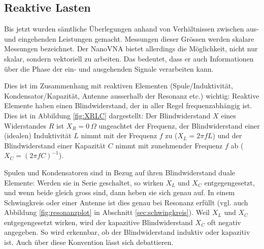 \documentclass[twoside,a4paper,11pt,halfparskip,DIV=11,notitlepage]{scrartcl}
\begin{document}
\subsection{Reaktive Lasten}\label{sec:vectors}
Bis jetzt wurden sämtliche Überlegungen anhand von Verhältnissen zwischen
aus- und eingehenden Leistungen gemacht. Messungen dieser Grössen werden
skalare Messungen bezeichnet. Der NanoVNA bietet allerdings die Möglichkeit,
nicht nur skalar, sondern vektoriell zu arbeiten. Das bedeutet, dass er auch
Informationen über die Phase der ein- und ausgehenden Signale verarbeiten kann.

Dies ist im Zusammenhang mit reaktiven Elementen (Spule/Induktivität,
Kondensator/Kapazität, Antenne ausserhalb der Resonanz etc.) wichtig: Reaktive
Elemente haben einen Blindwiderstand, der in aller Regel frequenzabhängig ist.
Dies ist in Abbildung \ref{fig:XRLC} dargestellt: Der Blindwiderstand $X$ eines
Widerstandes $R$ ist $X_R=0~\Omega$ ungeachtet der Frequenz, der Blindwiderstand
einer (idealen) Induktivität $L$ nimmt mit der Frequenz $f$ zu ($X_L=2\pi f L$)
und der Blindwiderstand einer Kapazität $C$ nimmt mit zunehmender Frequenz $f$
ab ($X_C=(2\pi f C)^{-1}$).

Spulen und Kondensatoren sind in Bezug auf ihren Blindwiderstand duale Elemente:
Werden sie in Serie geschaltet, so wirken $X_L$ und $X_C$ entgegengesetzt, und
wenn beide gleich gross sind, dann heben sie sich genau auf. In einem
Schwingkreis oder einer Antenne ist dies genau bei Resonanz erfüllt (vgl. auch
Abbildung \ref{fig:resonanzplot} in Abschnitt \ref{sec:schwingkreis}). Weil
$X_L$ und $X_C$ entgegengesetzt wirken, wird der kapazitive Blindwiderstand
$X_C$ oft negativ angegeben. So wird erkennbar, ob der Blindwiderstand induktiv
oder kapazitiv ist. Auch über diese Konvention lässt sich debattieren.
\end{document}
